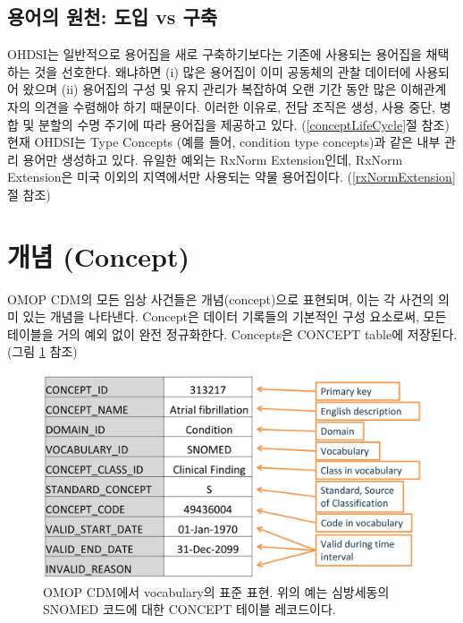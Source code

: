\documentclass[11pt]{book}
\theoremstyle{definition}
\theoremstyle{definition}
\theoremstyle{definition}
\theoremstyle{remark}
\begin{document}
\subsection{용어의 원천: 도입 vs 구축}\label{---vs-}

OHDSI는 일반적으로 용어집을 새로 구축하기보다는 기존에 사용되는 용어집을
채택하는 것을 선호한다. 왜냐하면 (i) 많은 용어집이 이미 공동체의 관찰
데이터에 사용되어 왔으며 (ii) 용어집의 구성 및 유지 관리가 복잡하여 오랜
기간 동안 많은 이해관계자의 의견을 수렴해야 하기 때문이다. 이러한
이유로, 전담 조직은 생성, 사용 중단, 병합 및 분할의 수명 주기에 따라
용어집을 제공하고 있다. (\ref{conceptLifeCycle}절 참조) 현재 OHDSI는
Type Concepts (예를 들어, condition type concepts)과 같은 내부 관리
용어만 생성하고 있다. 유일한 예외는 RxNorm Extension인데, RxNorm
Extension은 미국 이외의 지역에서만 사용되는 약물 용어집이다.
(\ref{rxNormExtension}절 참조)

\section{개념 (Concept)}\label{-concept}

OMOP CDM의 모든 임상 사건들은 개념(concept)으로 표현되며, 이는 각 사건의
의미 있는 개념을 나타낸다. Concept은 데이터 기록들의 기본적인 구성
요소로써, 모든 테이블을 거의 예외 없이 완전 정규화한다. Concepts은
CONCEPT table에 저장된다. (그림 \ref{fig:concept} 참조) 

\begin{figure}

{\centering \includegraphics[width=0.9\linewidth]{images/StandardizedVocabularies/concept} 

}

\caption{OMOP CDM에서 vocabulary의 표준 표현. 위의 예는 심방세동의 SNOMED 코드에 대한 CONCEPT 테이블 레코드이다.}\label{fig:concept}
\end{figure}
\end{document}
